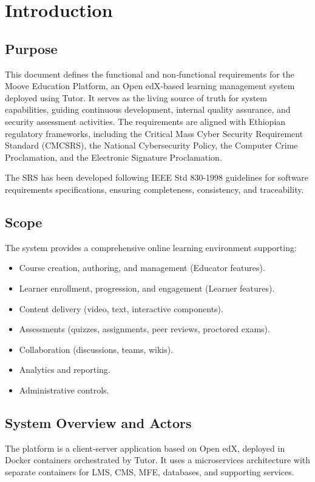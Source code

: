 \section{Introduction}
\subsection{Purpose}
This document defines the functional and non‑functional requirements for the Moove Education Platform, an Open edX‑based learning management system deployed using Tutor. It serves as the living source of truth for system capabilities, guiding continuous development, internal quality assurance, and security assessment activities. The requirements are aligned with Ethiopian regulatory frameworks, including the Critical Mass Cyber Security Requirement Standard (CMCSRS), the National Cybersecurity Policy, the Computer Crime Proclamation, and the Electronic Signature Proclamation.

The SRS has been developed following IEEE Std 830-1998 guidelines for software requirements specifications, ensuring completeness, consistency, and traceability.

\subsection{Scope}
The system provides a comprehensive online learning environment supporting:
\begin{itemize}
    \item Course creation, authoring, and management (Educator features).
    \item Learner enrollment, progression, and engagement (Learner features).
    \item Content delivery (video, text, interactive components).
    \item Assessments (quizzes, assignments, peer reviews, proctored exams).
    \item Collaboration (discussions, teams, wikis).
    \item Analytics and reporting.
    \item Administrative controls.
\end{itemize}

\subsection{System Overview and Actors}
The platform is a client‑server application based on Open edX, deployed in Docker containers orchestrated by Tutor. It uses a microservices architecture with separate containers for LMS, CMS, MFE, databases, and supporting services.

